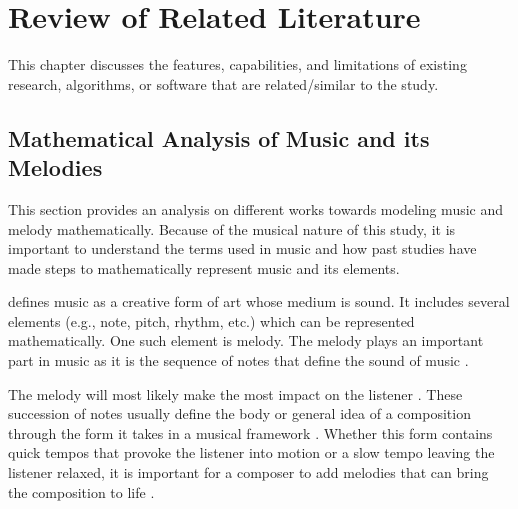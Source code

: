 %
%
%                 

\chapter{Review of Related Literature}
\label{sec:relatedlit}
\begin{comment}
then for team MusicG my suggested columns would be 
2.1 Authors | Focus (if melody, chord, progression, sequence) | Model (what math formula or name did they use no need to put formula sa table) 
2.2 Authors | Name of Tool | Platform | Input Type | Algorithm (what they used to generate sequences)
2.3 Authors | Name of Tool | How many testers | Comments  and other  reported findings
\end{comment}

This chapter discusses the features, capabilities, and limitations of existing research, algorithms, or software that are related/similar to the study.

\section{Mathematical Analysis of Music and its Melodies}
This section provides an analysis on different works towards modeling music and melody mathematically. Because of the musical nature of this study, it is important to understand the terms used in music and how past studies have made steps to mathematically represent music and its elements.

\citet{loy2011musimathics} defines music as a creative form of art whose medium is sound. It includes several elements (e.g., note, pitch, rhythm, etc.) which can be represented mathematically. One such element is melody. The melody plays an important part in music \citep{unehara2001composition,unehara2005music} as it is the sequence of notes that define the sound of music \citep{ryynanen2008automatic}. 

The melody will most likely make the most impact on the listener \citep{jarret2008music}. These succession of notes usually define the body or general idea of a composition through the form it takes in a musical framework \citep{jarret2008music}. Whether this form contains quick tempos that provoke the listener into motion or a slow tempo leaving the listener relaxed, it is important for a composer to add melodies that can bring the composition to life \citep{jarret2008music}. 

